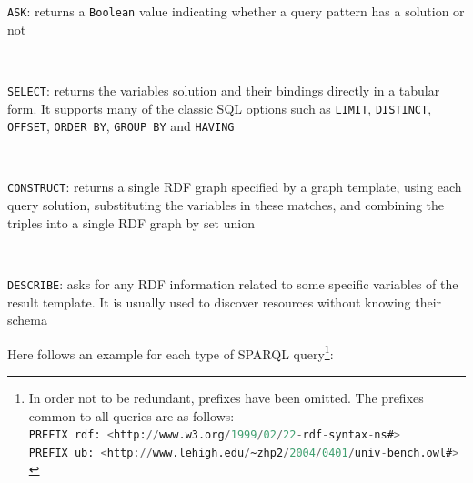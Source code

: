 \documentclass[10pt, a4paper]{report}
\begin{document}
\begin{enumerate}
	\begin{minipage}{0.92\textwidth}
		\item
		\texttt{ASK}: returns a \texttt{Boolean} value indicating whether a query pattern has a solution or not \\
	\end{minipage} \\
	\begin{minipage}{0.92\textwidth}
		\item
		\texttt{SELECT}: returns the variables solution and their bindings directly  in a tabular form. It supports many of the classic SQL options such as \texttt{LIMIT}, \texttt{DISTINCT}, \texttt{OFFSET}, \texttt{ORDER BY}, \texttt{GROUP BY} and \texttt{HAVING} \\
	\end{minipage} \\
	\begin{minipage}{0.92\textwidth}
		\item
		\texttt{CONSTRUCT}: returns a single RDF graph specified by a graph template, using each query solution, substituting the variables in these matches, and combining the triples into a single RDF graph by set union \\
	\end{minipage} \\
	\begin{minipage}{0.92\textwidth}
		\item
		\texttt{DESCRIBE}: asks for any RDF information related to some specific variables of the result template. It is usually used to discover resources without knowing their schema \\
	\end{minipage}
\end{enumerate}

Here follows an example for each type of SPARQL query\footnote{In order not to be redundant, prefixes have been omitted. The prefixes common to all queries are as follows:
	\vspace{0.1cm} \\
	\hspace*{0.8cm}\lstinline[language=sql]{PREFIX rdf: <http://www.w3.org/1999/02/22-rdf-syntax-ns#>} \\
	\hspace*{0.8cm}\lstinline[language=sql]{PREFIX ub: <http://www.lehigh.edu/~zhp2/2004/0401/univ-bench.owl#>} \\
}: \\
\end{document}
